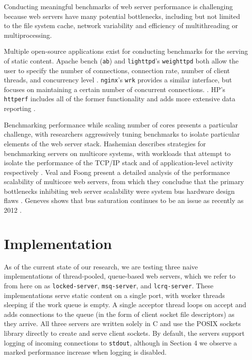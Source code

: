\documentclass[twoside,10pt]{article}
\begin{document}
\begin{multicols}{2}
Conducting meaningful benchmarks of web server performance is
challenging because web servers have many potential bottlenecks,
including but not limited to the file system cache, network
variability and efficiency of multithreading or multiprocessing.

Multiple open-source applications exist for conducting benchmarks for
the serving of static content. Apache bench (\verb+ab+) and
\verb+lighttpd+'s \verb+weighttpd+ both allow the user to specify the
number of connections, connection rate, number of client threads, and
concurrency level
\cite{fielding1997apache,kneschke2003lighttpd}. \verb+nginx+'s
\verb+wrk+ provides a similar interface, but focuses on maintaining a
certain number of concurrent connections. \cite{syosevnginx}. HP's
\verb+httperf+ includes all of the former functionality and adds more
extensive data reporting \cite{mosberger1998httperf}.

Benchmarking performance while scaling number of cores presents a
particular challenge, with researchers aggressively tuning benchmarks
to isolate particular elements of the web server stack. Hashemian
describes strategies for benchmarking servers on multicore systems,
with workloads that attempt to isolate the performance of the TCP/IP
stack and of application-level activity respectively
\cite{hashemian2013improving}. Veal and Foong present a detailed
analysis of the performance scalability of multicore web servers, from
which they concludue that the primary bottlenecks inhibiting web
server scalability were system bus hardware design flaws
\cite{veal2007performance}. Geneves shows that bus saturation
continues to be an issue as recently as 2012
\cite{geneves2012analysis}.

\section{Implementation }
As of the current state of our research, we are testing three naive
implementations of thread-pooled, queue-based web servers, which we
refer to from here on as \verb+locked-server+, \verb+msq-server+, and
\verb+lcrq-server+. These implementations serve static content on a
single port, with worker threads sleeping if the work queue is
empty. A single acceptor thread loops on accept and adds connections
to the queue (in the form of client socket file descriptors) as they
arrive. All three servers are written solely in C and use the POSIX
sockets library directly to create and serve client sockets. By
default, the servers support logging of incoming connections to
\verb+stdout+, although in Section 4 we observe a marked performance
increase when logging is disabled.


\end{multicols}
\end{document}
